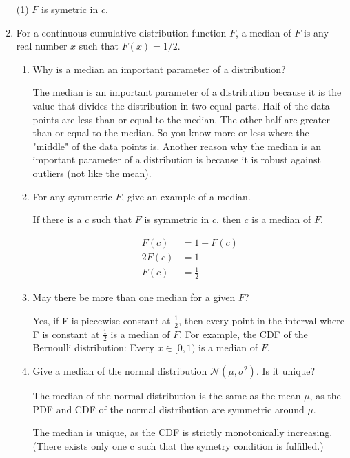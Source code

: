 \documentclass[12pt]{article}
\begin{document}
\begin{enumerate}
(1) $F$ is symetric in $c$.

\item For a continuous cumulative distribution function $F$, a median of $F$ is any real number $x$ such that $F(x)=1 / 2$. 

\begin{enumerate}
     


    \item Why is a median an important parameter of a distribution?

The median is an important parameter of a distribution because it is the value that divides the distribution in two equal parts. Half of the data points are less than or equal to the median. The other half are greater than or equal to the median. So you know more or less where the "middle" of the data points is. 
Another reason why the median is an important parameter of a distribution is because it is robust against outliers (not like the mean).

\item For any symmetric $F$, give an example of a median. 

If there is a $c$ such that $F$ is symmetric in $c$, then $c$ is a median of $F$.

\begin{align*}
    F(c)&=1-F(c)    \\
    2F(c)&=1\\
     F(c)&=\frac{1}{2}
\end{align*}


\item May there be more than one median for a given $F$?

Yes, if F is piecewise constant at $\frac{1}{2}$, then every point in the interval where F is constant at $\frac{1}{2}$ is a median of $F$.
For example, the CDF of the Bernoulli distribution: Every $x \in [0,1)$ is a median of $F$.


\item Give a median of the normal distribution $\mathcal{N}\left(\mu, \sigma^{2}\right)$. Is it unique?

The median of the normal distribution is the same as the mean $\mu$, as  the PDF and CDF of the normal distribution are symmetric around $\mu$.

The median is unique, as the CDF is strictly monotonically increasing. (There exists only one c such that the symetry condition is fulfilled.)
\end{enumerate}

\end{enumerate}
\end{document}
